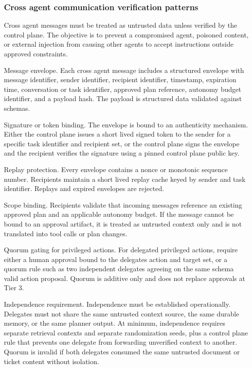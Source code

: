 \documentclass[11pt]{article}
\begin{document}
\subsubsection{Cross agent communication verification patterns}
Cross agent messages must be treated as untrusted data unless verified by the control plane. The objective is to prevent a compromised agent, poisoned content, or external injection from causing other agents to accept instructions outside approved constraints.

Message envelope. Each cross agent message includes a structured envelope with message identifier, sender identifier, recipient identifier, timestamp, expiration time, conversation or task identifier, approved plan reference, autonomy budget identifier, and a payload hash. The payload is structured data validated against schemas.

Signature or token binding. The envelope is bound to an authenticity mechanism. Either the control plane issues a short lived signed token to the sender for a specific task identifier and recipient set, or the control plane signs the envelope and the recipient verifies the signature using a pinned control plane public key.

Replay protection. Every envelope contains a nonce or monotonic sequence number. Recipients maintain a short lived replay cache keyed by sender and task identifier. Replays and expired envelopes are rejected.

Scope binding. Recipients validate that incoming messages reference an existing approved plan and an applicable autonomy budget. If the message cannot be bound to an approval artifact, it is treated as untrusted context only and is not translated into tool calls or plan changes.

Quorum gating for privileged actions. For delegated privileged actions, require either a human approval bound to the delegate\textquotesingle s action and target set, or a quorum rule such as two independent delegates agreeing on the same schema valid action proposal. Quorum is additive only and does not replace approvals at Tier 3.

Independence requirement. Independence must be established operationally. Delegates must not share the same untrusted context source, the same durable memory, or the same planner output. At minimum, independence requires separate retrieval contexts and separate randomization seeds, plus a control plane rule that prevents one delegate from forwarding unverified context to another. Quorum is invalid if both delegates consumed the same untrusted document or ticket content without isolation.
\end{document}

